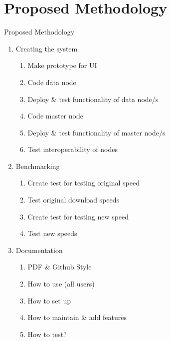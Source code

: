 \documentclass{beamer}
\begin{document}
\section{Proposed Methodology}
\begin{frame}{Proposed Methodology}
\begin{enumerate}
    \item Creating the system
    \begin{enumerate}
        \item Make prototype for UI
        \item Code data node
        \item Deploy \& test functionality of data node/s
        \item Code master node
        \item Deploy \& test functionality of master node/s
        \item Test interoperability of nodes
    \end{enumerate}
    \item Benchmarking
    \begin{enumerate}
        \item Create test for testing original speed
        \item Test original download speeds
        \item Create test for testing new speed
        \item Test new speeds
    \end{enumerate}
        \item Documentation
    \begin{enumerate}
        \item PDF & Github Style
        \item How to use (all users)
        \item How to set up
        \item How to maintain & add features
        \item How to test?
    \end{enumerate}
\end{enumerate}
\end{frame}
\end{document}

